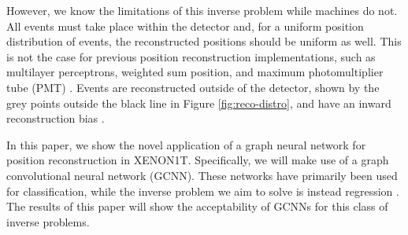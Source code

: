 \documentclass[../thesis.tex]{subfiles}
\begin{document}
\par However, we know the limitations of this inverse problem while machines do not.
All events must take place within the detector and, for a uniform position distribution of events, the reconstructed positions should be uniform as well.
This is not the case for previous position reconstruction implementations, such as multilayer perceptrons, weighted sum position, and maximum photomultiplier tube (PMT) \cite{Bart}.
Events are reconstructed outside of the detector, shown by the grey points outside the black line in Figure \ref{fig:reco-distro}, and have an inward reconstruction bias \cite{Bart}.

\par In this paper, we show the novel application of a graph neural network for position reconstruction in XENON1T.
Specifically, we will make use of a graph convolutional neural network (GCNN).
These networks have primarily been used for classification, while the inverse problem we aim to solve is instead regression \cite{GCNN_Kipf}.
The results of this paper will show the acceptability of GCNNs for this class of inverse problems.
\end{document}
